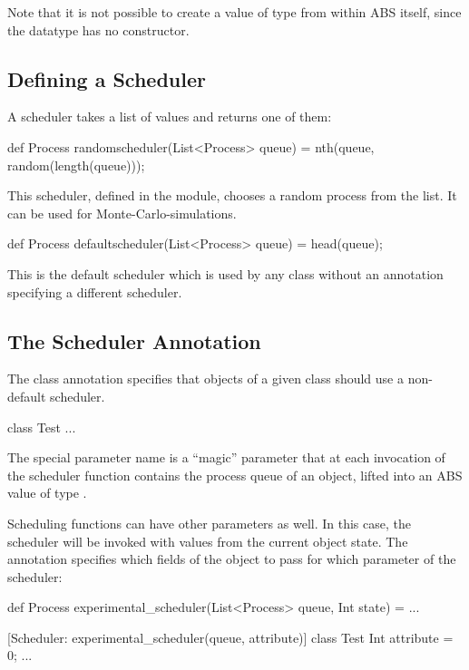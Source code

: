    Note that it is not possible to create a value of type 
   from within ABS itself, since the datatype  has no
   constructor.

\subsection{Defining a Scheduler}

   A scheduler takes a list of  values and returns one of
   them:

\begin{absexample} 
def Process randomscheduler(List<Process> queue) =
  nth(queue, random(length(queue)));
\end{absexample} 

   This scheduler, defined in the  module, chooses a
   random process from the list.  It can be used for
   Monte-Carlo-simulations.

\begin{absexample} 
def Process defaultscheduler(List<Process> queue) = head(queue);
\end{absexample} 

   This is the default scheduler which is used by any class without an
   annotation specifying a different scheduler.

\subsection{The Scheduler Annotation}

   The class annotation  specifies that objects of a given
   class should use a non-default scheduler.

\begin{absexample} 
class Test { ... }
\end{absexample} 

The special parameter name  is a ``magic'' parameter that at each invocation of
   the scheduler function contains the process queue of an object,
   lifted into an ABS value of type .

   Scheduling functions can have other parameters as well.  In this
   case, the scheduler will be invoked with values from the current
   object state.  The annotation specifies which fields of the object to
   pass for which parameter of the scheduler:

\begin{absexample} 
def Process experimental_scheduler(List<Process> queue, Int state) = ...

[Scheduler: experimental_scheduler(queue, attribute)]
class Test {
  Int attribute = 0;
  ...
}
\end{absexample} 

